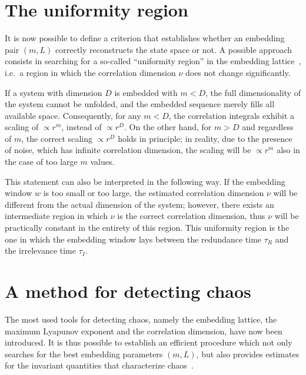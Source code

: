 \section{The uniformity region}\label{sec: uniformity region}

It is now possible to define a criterion that establishes whether an embedding
pair $(m,L)$ correctly reconstructs the state space or not.
A possible approach consists in searching for a so-called ``uniformity region'' in the embedding
lattice~\cite{ref:perinelli2020chasing}, i.e.\ a region in which the correlation dimension $\nu$
does not change significantly.

If a system with dimension $D$ is embedded with $m < D$, the full dimensionality of the system cannot be unfolded, and the embedded sequence merely fills all available space. Consequently, for any $m < D$, the correlation integrals exhibit a scaling of $\propto r^m$, instead of $\propto r^D$.
On the other hand, for $m > D$ and regardless of $m$, the correct scaling $\propto r^D$ holds in principle;
in reality, due to the presence of noise, which has infinite correlation dimension, the scaling will
be $\propto r^m$ also in the case of too large $m$ values.

This statement can also be interpreted in the following way.
If the embedding window $w$ is too small or too large, the estimated correlation dimension $\nu$
will be different from the actual dimension of the system; however, there exists an intermediate region
in which $\nu$ is the correct correlation dimension, thus $\nu$ will be practically constant in
the entirety of this region. This uniformity region is the one in which the embedding window lays between
the redundance time $\tau_R$ and the irrelevance time $\tau_I$.


\section{A method for detecting chaos}\label{sec: method for chaos}

The most used tools for detecting chaos, namely the embedding lattice, the maximum Lyapunov exponent
and the correlation dimension, have now been introduced.
It is thus possible to establish an efficient procedure which not only searches for the best
embedding parameters $(m,L)$, but also provides estimates for the invariant quantities that
characterize chaos~\cite{ref:perinelli2020chasing}.

